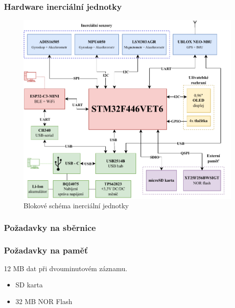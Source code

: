 \documentclass[%
  12pt,       				%
	t,                  %
	aspectratio=1610,   %
	unicode,						%
]{beamer}				    	%
\begin{document}
\begin{frame} 
	\frametitle{Hardware inerciální jednotky}
	
			\begin{figure}%
				\centering
				
				\includegraphics[width=0.55\columnwidth]{obrazky/IMUnav_H00_block}
				\caption{Blokové schéma inerciální jednotky}%
			\end{figure}
	
\end{frame} 

\begin{frame} 
	\frametitle{Požadavky na sběrnice}
	
	

	
\end{frame} 


\begin{frame} 
	\frametitle{Požadavky na paměť}
	
	
	12 MB dat při dvouminutovém záznamu.
	
	\begin{itemize}
	\item SD karta
	\item 32 MB NOR Flash
	\end{itemize}
	
\end{frame} 
\end{document}

